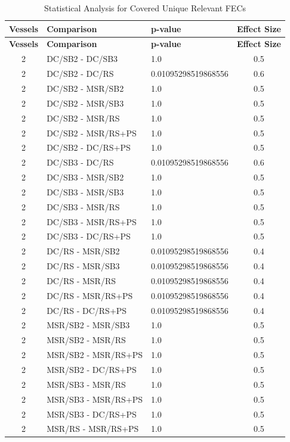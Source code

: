 \documentclass[10pt,a4paper]{article}
\begin{document}
\begin{longtable}{c l l c}
\caption{Statistical Analysis for Covered Unique Relevant FECs} \\
\toprule
\textbf{Vessels} & \textbf{Comparison} & \textbf{p-value} & \textbf{Effect Size} \\
\midrule
\endfirsthead
\toprule
\textbf{Vessels} & \textbf{Comparison} & \textbf{p-value} & \textbf{Effect Size} \\
\midrule
\endhead
\bottomrule
\endfoot

2 & DC/SB2 - DC/SB3 & 1.0 & 0.5 \\
2 & DC/SB2 - DC/RS & 0.01095298519868556 & 0.6 \\
2 & DC/SB2 - MSR/SB2 & 1.0 & 0.5 \\
2 & DC/SB2 - MSR/SB3 & 1.0 & 0.5 \\
2 & DC/SB2 - MSR/RS & 1.0 & 0.5 \\
2 & DC/SB2 - MSR/RS+PS & 1.0 & 0.5 \\
2 & DC/SB2 - DC/RS+PS & 1.0 & 0.5 \\
2 & DC/SB3 - DC/RS & 0.01095298519868556 & 0.6 \\
2 & DC/SB3 - MSR/SB2 & 1.0 & 0.5 \\
2 & DC/SB3 - MSR/SB3 & 1.0 & 0.5 \\
2 & DC/SB3 - MSR/RS & 1.0 & 0.5 \\
2 & DC/SB3 - MSR/RS+PS & 1.0 & 0.5 \\
2 & DC/SB3 - DC/RS+PS & 1.0 & 0.5 \\
2 & DC/RS - MSR/SB2 & 0.01095298519868556 & 0.4 \\
2 & DC/RS - MSR/SB3 & 0.01095298519868556 & 0.4 \\
2 & DC/RS - MSR/RS & 0.01095298519868556 & 0.4 \\
2 & DC/RS - MSR/RS+PS & 0.01095298519868556 & 0.4 \\
2 & DC/RS - DC/RS+PS & 0.01095298519868556 & 0.4 \\
2 & MSR/SB2 - MSR/SB3 & 1.0 & 0.5 \\
2 & MSR/SB2 - MSR/RS & 1.0 & 0.5 \\
2 & MSR/SB2 - MSR/RS+PS & 1.0 & 0.5 \\
2 & MSR/SB2 - DC/RS+PS & 1.0 & 0.5 \\
2 & MSR/SB3 - MSR/RS & 1.0 & 0.5 \\
2 & MSR/SB3 - MSR/RS+PS & 1.0 & 0.5 \\
2 & MSR/SB3 - DC/RS+PS & 1.0 & 0.5 \\
2 & MSR/RS - MSR/RS+PS & 1.0 & 0.5 \\

\end{longtable}
\end{document}
